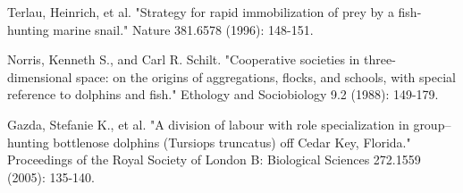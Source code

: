 \documentclass[12pt,a4paper,final]{iopart}
\begin{document}
\begin{thebibliography}{10}
Terlau, Heinrich, et al. "Strategy for rapid immobilization of prey by a fish-hunting marine snail." Nature 381.6578 (1996): 148-151.

Norris, Kenneth S., and Carl R. Schilt. "Cooperative societies in three-dimensional space: on the origins of aggregations, flocks, and schools, with special reference to dolphins and fish." Ethology and Sociobiology 9.2 (1988): 149-179.

Gazda, Stefanie K., et al. "A division of labour with role specialization in group–hunting bottlenose dolphins (Tursiops truncatus) off Cedar Key, Florida." Proceedings of the Royal Society of London B: Biological Sciences 272.1559 (2005): 135-140.




\end{thebibliography}
\end{document}
